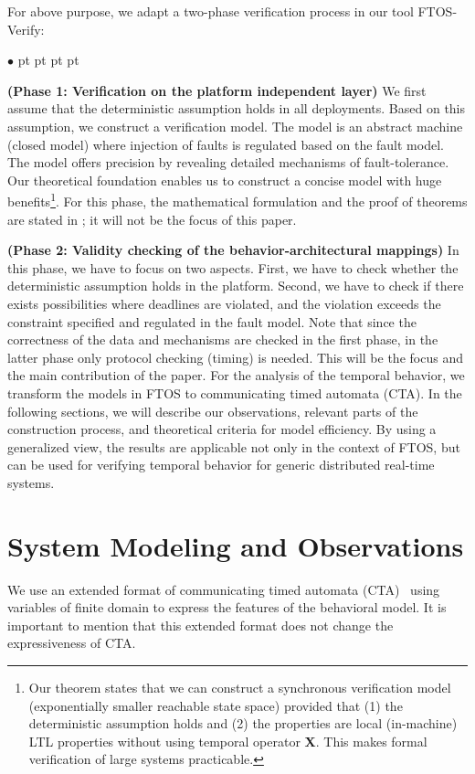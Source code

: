 \documentclass[10pt, a4paper, onecolumn, conference, compsocconf]{IEEEtran}
\newenvironment{list1}{\begin{list}{$\bullet$}
{\topsep 0 pt \parsep 0 pt \partopsep 0 pt \itemsep 0
pt}}{\end{list}}
\begin{document}
For above purpose, we adapt a two-phase verification process in our tool FTOS-Verify:
\begin{list1}
\item \textbf{(Phase 1: Verification on the platform independent layer)} We first assume that the deterministic assumption holds in all deployments. Based on this assumption, we construct a verification model. The model is an abstract machine (closed model) where injection of faults is regulated based on the fault model. The model offers precision by revealing detailed mechanisms of fault-tolerance. Our theoretical
      foundation enables us to construct a concise model with huge benefits\footnote{Our theorem states that we can construct a synchronous verification model (exponentially smaller reachable state space) provided that (1) the deterministic assumption holds and (2) the properties are local (in-machine) LTL properties without
      using temporal operator \textbf{X}. This makes formal verification of large systems practicable.}. For this phase, the mathematical formulation and the proof of theorems are stated in \cite{Cheng:2009:FTOSVerify}; it will not be the focus of this paper.

\item \textbf{(Phase 2: Validity checking of the behavior-architectural mappings)} In this phase, we have to focus on two aspects. First, we have to check whether the deterministic assumption holds in the platform. Second, we have to check if there exists possibilities where deadlines are violated, and the violation exceeds the constraint specified and regulated in the fault model. Note that since the correctness of the data and mechanisms are checked in the first phase, in the latter phase only protocol checking (timing) is needed. This will be the focus and the main contribution of the paper. For the analysis of the temporal behavior, we transform the models in FTOS to communicating timed automata (CTA). In the following sections, we will describe our observations, relevant parts of the construction process, and theoretical criteria for model efficiency. By using a generalized view, the results are applicable not only in the context of FTOS, but can be used for verifying temporal behavior for generic distributed real-time systems.
\end{list1}

\section{System Modeling and Observations\label{sec.System.Modeling.Observations}}
We use an extended format of communicating timed automata (CTA)~\cite{bdl:2004:uppaal} using variables of finite domain to express the features of the behavioral model. It is important to mention that this extended format does not change the expressiveness of CTA.
\end{document}
